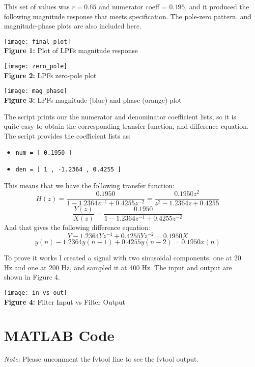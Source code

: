 \documentclass[]{report}
\begin{document}
\newpage

This set of values was $r=0.65$ and numerator coeff = $0.195$, and it produced the following magnitude response that meets specification. The pole-zero pattern, and magnitude-phase plots are also included here.

\begin{center}
	\texttt{[image: final\_plot]} \\
	\centering
	\textbf{Figure 1:} Plot of LPFs magnitude response
	
	\texttt{[image: zero\_pole]} \\
	\centering
	\textbf{Figure 2:} LPFs zero-pole plot
	
	\texttt{[image: mag\_phase]} \\
	\centering
	\textbf{Figure 3:} LPFs magnitude (blue) and phase (orange) plot
	
\end{center}

The script prints our the numerator and denominator coefficient lists, so it is quite easy to obtain the corresponding transfer function, and difference equation. The script provides the coefficient lists as:
\begin{itemize}
	\item \texttt{num = [ 0.1950 ]}
	\item \texttt{den = [ 1 , -1.2364 , 0.4255 ]}
\end{itemize}
This means that we have the following transfer function:
	\[	H(z) = \frac{0.1950}{1 - 1.2364z^{-1} + 0.4255z^{-2}} = \frac{0.1950z^2}{z^2 - 1.2364z + 0.4255}	\]
	\[	\frac{Y(z)}{X(z)} = \frac{0.1950}{1 - 1.2364z^{-1} + 0.4255z^{-2}}\]
And that gives the following difference equation:
	\[ Y -1.2364Yz^{-1} + 0.4255Yz^{-2} = 0.1950X\]
	\[ y(n) - 1.2364y(n-1) + 0.4255y(n-2) = 0.1950x(n)	\]


To prove it works I created a signal with two sinusoidal components, one at 20 Hz and one at 200 Hz, and sampled it at 400 Hz. The input and output are shown in Figure 4.

\begin{center}
	\texttt{[image: in\_vs\_out]} \\
	\centering
	\textbf{Figure 4:} Filter Input vs Filter Output
\end{center}

\newpage
\section*{MATLAB Code}
\textit{Note:} Please uncomment the fvtool line to see the fvtool output.
\end{document}
